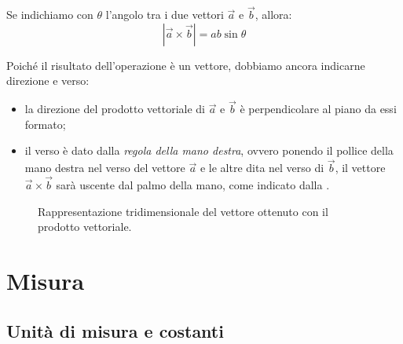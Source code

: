 \documentclass[a4paper,11pt,italian]{article}
\begin{document}
\begin{description}
  Se indichiamo con $ \theta $ l'angolo tra i due vettori $ \vec{a} $ e $ \vec{b} $, allora: 
  \[ | \vec{a} \times \vec{b} | = ab\sin\theta \]

  Poiché il risultato dell'operazione è un vettore, dobbiamo ancora indicarne direzione e verso:
  \begin{itemize}
    \item la direzione del prodotto vettoriale di $ \vec{a} $ e $ \vec{b} $ è perpendicolare al piano da essi formato;
    \item il verso è dato dalla \emph{regola della mano destra}, ovvero ponendo il pollice della mano destra nel verso del vettore $ \vec{a} $ e le altre dita nel verso di $ \vec{b} $, il vettore $ \vec{a} \times \vec{b} $ sarà uscente dal palmo della mano, come indicato dalla .
  \end{itemize}
  
\begin{figure}[htpb]\centering
{}\caption{Rappresentazione tridimensionale del vettore ottenuto con il prodotto vettoriale.}
\label{img:vettoriale2}
\end{figure}
\end{description}


\newpage
\section{Misura}

\subsection{Unità di misura e costanti}
\end{document}
